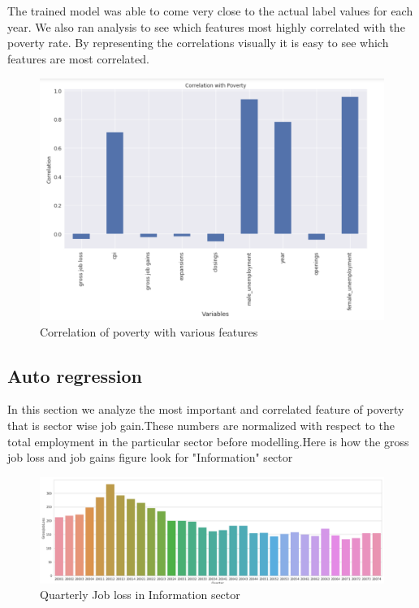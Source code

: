 \documentclass[11pt,letterpaper]{article}
\begin{document}
The trained model was able to come very close to the actual label values for each year. We also ran analysis to see which features most highly correlated with the poverty rate. By representing the correlations visually it is easy to see which features are most correlated. 

\begin{figure}[h]
	\includegraphics[width=\linewidth]{"./pictures/Correlation_With_Poverty"}
	\caption{Correlation of poverty with various features}
    \label{fig:Feature Correlation}
\end{figure}

\subsection{Auto regression}
\label{ssec:autoregResult}

In this section we analyze the most important and correlated feature of poverty that is sector wise job gain.These numbers are normalized with respect to the total employment in the particular sector before modelling.Here is how the gross job loss and job gains figure look for "Information" sector

\begin{figure}[h]
	\includegraphics[width=\linewidth]{"./pictures/jobloss"}
	\caption{Quarterly Job loss in Information sector}
    \label{fig:Job loss figures in Information sector}
\end{figure}
\end{document}
